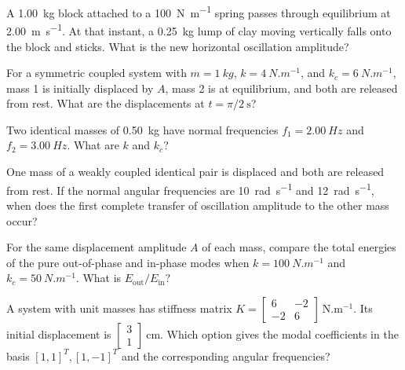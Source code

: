\documentclass[10pt,a4paper]{physicsquiz}
\begin{document}
\begin{quizquestions}[2]
  \item A \SI{1.00}{kg} block attached to a \SI{100}{N.m^{-1}} spring passes through equilibrium at \SI{2.00}{m.s^{-1}}. At that instant, a \SI{0.25}{kg} lump of clay moving vertically falls onto the block and sticks. What is the new horizontal oscillation amplitude?
  \item For a symmetric coupled system with \(m=\SI{1}{kg}\), \(k=\SI{4}{N.m^{-1}}\), and \(k_c=\SI{6}{N.m^{-1}}\), mass 1 is initially displaced by \(A\), mass 2 is at equilibrium, and both are released from rest. What are the displacements at \(t=\pi/2\ \mathrm{s}\)?
  \item Two identical masses of \SI{0.50}{kg} have normal frequencies \(f_1=\SI{2.00}{Hz}\) and \(f_2=\SI{3.00}{Hz}\). What are \(k\) and \(k_c\)?
  \item One mass of a weakly coupled identical pair is displaced and both are released from rest. If the normal angular frequencies are \SI{10}{rad.s^{-1}} and \SI{12}{rad.s^{-1}}, when does the first complete transfer of oscillation amplitude to the other mass occur?
  \item For the same displacement amplitude \(A\) of each mass, compare the total energies of the pure out-of-phase and in-phase modes when \(k=\SI{100}{N.m^{-1}}\) and \(k_c=\SI{50}{N.m^{-1}}\). What is \(E_{\mathrm{out}}/E_{\mathrm{in}}\)?
  \item A system with unit masses has stiffness matrix \(K=\begin{bmatrix}6&-2\\-2&6\end{bmatrix}\ \mathrm{N.m^{-1}}\). Its initial displacement is \(\begin{bmatrix}3\\1\end{bmatrix}\ \mathrm{cm}\). Which option gives the modal coefficients in the basis \({[1,1]}^T,{[1,-1]}^T\) and the corresponding angular frequencies?

\end{quizquestions}
\end{document}
